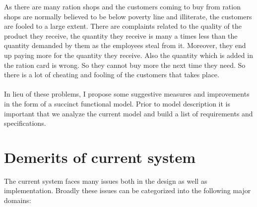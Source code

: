 \documentclass{article}
\begin{document}
As there are many ration shops and the customers coming to buy from ration shops are normally believed to be below poverty line and illiterate, the customers are fooled to a large extent. There are complaints related to the quality of the product they receive, the quantity they receive is many a times less than the quantity demanded by them as the employees steal from it. Moreover, they end up paying more for the quantity they receive. Also the quantity which is added in the ration card is wrong. So they cannot buy more the next time they need. So there is a lot of cheating and fooling of the customers that takes place.\\ \\ In lieu of these problems, I propose some suggestive measures and improvements in the form of a succinct functional model. Prior to model description it is important that we analyze the current model and build a list of requirements and specifications. 

\section{Demerits of current system}

The current system faces many issues both in the design as well as implementation. Broadly these issues can be categorized into the following major domains:
\end{document}

